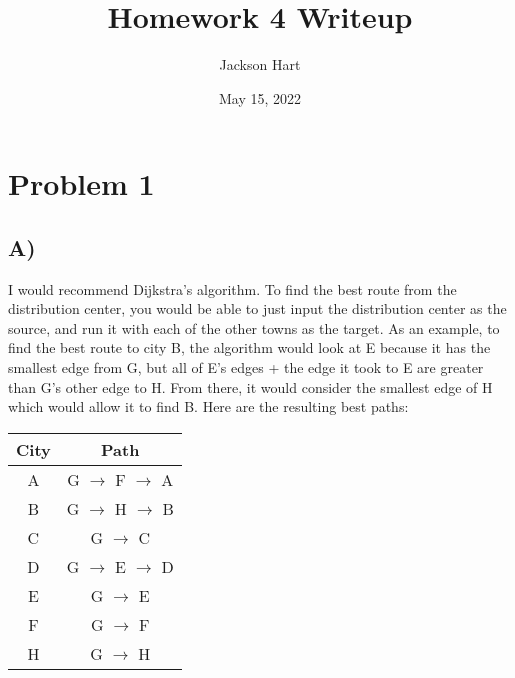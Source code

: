 \documentclass[12pt, letterpaper]{article}
\title{Homework 4 Writeup}
\author{Jackson Hart}
\date{May 15, 2022}
\begin{document}
\maketitle

\section*{Problem 1}
\subsection*{A)}
I would recommend Dijkstra's algorithm. To find the best route from the distribution center, you would be able to just input the distribution center as the source, and run it with each of the other towns as the target. As an example, to find the best route to city B, the algorithm would look at E because it has the smallest edge from G, but all of E's edges + the edge it took to E are greater than G's other edge to H. From there, it would consider the smallest edge of H which would allow it to find B. Here are the resulting best paths:

\begin{center}
\begin{tabular}{||c c ||} 
 \hline
 City & Path \\ [0.5ex] 
 \hline\hline
 A & G $\rightarrow$ F $\rightarrow$ A \\ 
 \hline
 B & G $\rightarrow$ H $\rightarrow$ B \\
 \hline
 C & G $\rightarrow$ C \\
 \hline
 D & G $\rightarrow$ E $\rightarrow$ D \\
 \hline
 E & G $\rightarrow$ E \\
 \hline 
 F & G $\rightarrow$ F \\ 
 \hline
 H & G $\rightarrow$ H \\ [1ex] 
 \hline
\end{tabular}
\end{center}
\newpage
\end{document}
